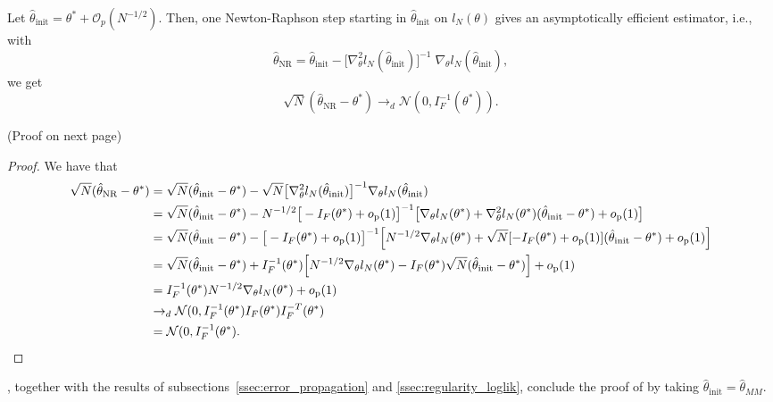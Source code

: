\documentclass[journal]{IEEEtran}
\newcommand{\thetaNR}{\hat \theta_\text{NR}}
\newcommand{\thetainit}{\hat \theta_\text{init}}
\newcommand{\hesslik}{\nabla_\theta^2 l_N}
\newcommand{\gradlik}{\nabla_\theta l_N}
\newcommand{\Fisher}{I_F}
\newcommand{\op}{o_\text{p}}
\begin{document}
\begin{lemma}
    Let $\thetainit = \theta^* + \mathcal{O}_p(N^{-1/2})$. Then, one
    Newton-Raphson step starting in $\thetainit$ on $l_N(\theta)$ gives an
    asymptotically efficient estimator, i.e., with 
    \begin{equation}
        \hat \theta_\text{NR} = \thetainit - \big[\nabla_\theta^2 l_N(
        \thetainit)\big]^{-1} \; \nabla_\theta l_N(\thetainit),
    \end{equation}
    we get
    \begin{equation}
        \sqrt{N}(\hat \theta_\text{NR} - \theta^*) \rightarrow_d
        \mathcal{N}(0, I_F^{-1}(\theta^*)).
    \end{equation}
    \label{lemma:newton_efficient}
\end{lemma}
(Proof on next page)
\clearpage
\begin{proof}
    We have that
    \begin{align}
        \sqrt{N}(\thetaNR - \theta^*) &= \sqrt{N}(\thetainit - \theta^*)
        - \sqrt{N} \big[\hesslik(\thetainit) \big]^{-1} \gradlik(\thetainit)
        \notag \\
        &= \sqrt{N}(\thetainit - \theta^*) - N^{-1/2} \big[ -\Fisher(\theta^*)
    + \op(1) \big]^{-1} \big[ \gradlik(\theta^*)
        + \hesslik(\theta^*)(\thetainit - \theta^*)
    + \op(1) \big] \notag \\
    &= \sqrt{N}(\thetainit - \theta^*) - \big[ - \Fisher(\theta^*)
+ \op(1)\big]^{-1} \Big[ N^{-1/2} \gradlik(\theta^*)
    + \sqrt{N}[-\Fisher(\theta^*) + \op(1)](\thetainit - \theta^*) + \op(1)
\Big] \notag \\
&= \sqrt{N}(\thetainit - \theta^*) + \Fisher^{-1}(\theta^*) \Big[ N^{-1/2}
\gradlik(\theta^*) - \Fisher(\theta^*) \sqrt{N} (\thetainit - \theta^*) \Big]
+ \op(1) \notag \\
&= \Fisher^{-1}(\theta^*) N^{-1/2} \gradlik(\theta^*) + \op(1) \notag \\
&\to_d \mathcal{N}(0, \Fisher^{-1}(\theta^*) \Fisher(\theta^*)
\Fisher^{-T}(\theta^*) \notag \\
&= \mathcal{N}(0, \Fisher^{-1}(\theta^*).
    \end{align}
\end{proof}

, together with the results of
subsections~\ref{ssec:error_propagation} and \ref{ssec:regularity_loglik}, conclude
the proof of  by taking $\thetainit = \hat \theta_{MM}$.



\end{document}

